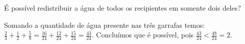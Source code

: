 \documentclass[10 pt,usenames,dvipsnames, oneside]{article}
\begin{document}
É possível redistribuir a água de todos os recipientes em somente dois deles?

\ifdefined\prof
\begin{solucao}
  Somando a quantidade de água presente nas três garrafas temos:   $\frac{2}{3}+\frac{1}{2}+\frac{5}{8} = \frac{16}{24}+\frac{12}{24}+\frac{15}{24} = \frac{43}{24}$. Concluímos que é possível, pois   $\frac{43}{24}<\frac{48}{24}=2$.

\end{solucao}
\fi
\end{document}
